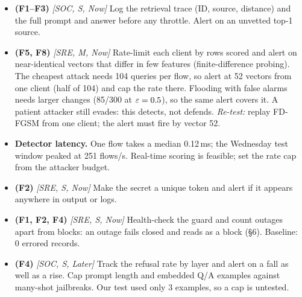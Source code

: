 \begin{itemize}
\item \textbf{(F1--F3)} \emph{[SOC, S, Now]} Log the retrieval trace (ID, source, distance) and the full prompt and answer before any throttle. Alert on an unvetted top-1 source.
\item \textbf{(F5, F8)} \emph{[SRE, M, Now]}  Rate-limit each client by rows scored and alert on near-identical vectors that differ in few features (finite-difference probing). The cheapest attack needs 104 queries per flow, so alert at 52 vectors from one client (half of 104) and cap the rate there. Flooding with false alarms needs larger changes (85/300 at $\varepsilon=0.5$), so the same alert covers it. A patient attacker still evades: this detects, not defends. \emph{Re-test:} replay FD-FGSM from one client; the alert must fire by vector 52.
\item \textbf{Detector latency.} One flow takes a median 0.12\,ms; the Wednesday test window peaked at 251 flows/s. Real-time scoring is feasible; set the rate cap from the attacker budget.
\item \textbf{(F2)} \emph{[SRE, S, Now]}  Make the secret a unique token and alert if it appears anywhere in output or logs.
\item \textbf{(F1, F2, F4)} \emph{[SRE, S, Now]}  Health-check the guard and count outages apart from blocks: an outage fails closed and reads as a block (\S6). Baseline: 0 errored records.
\item \textbf{(F4)} \emph{[SOC, S, Later]} Track the refusal rate by layer and alert on a fall as well as a rise. Cap prompt length and embedded Q/A examples against many-shot jailbreaks. Our test used only 3 examples, so a cap is untested.
\end{itemize}

